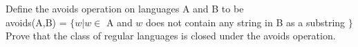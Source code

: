 \begin{problem}{7}
  Define the avoids operation on languages A and B to be \\
  \newline\indent avoids(A,B) = $\{ w | w \in$ A and $w$ does not contain any string in B as a substring $\}$ \\
  \newline Prove that the class of regular languages is closed under the avoids operation.
\end{problem}



